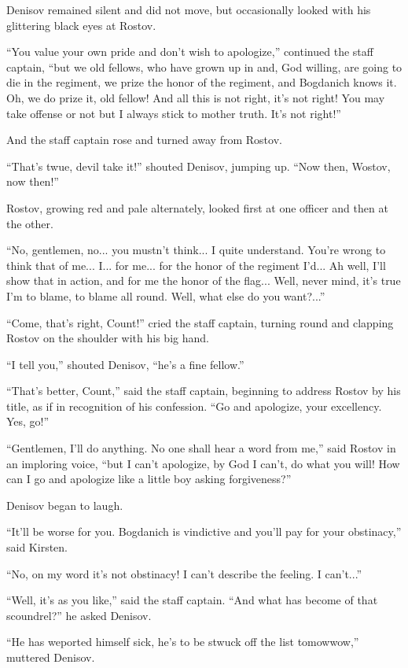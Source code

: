 Denisov remained silent and did not move, but occasionally looked
with his glittering black eyes at Rostov.

``You value your own pride and don't wish to apologize,''
continued the staff captain, ``but we old fellows, who have grown
up in and, God willing, are going to die in the regiment, we
prize the honor of the regiment, and Bogdanich knows it. Oh, we
do prize it, old fellow! And all this is not right, it's not
right! You may take offense or not but I always stick to mother
truth. It's not right!''

And the staff captain rose and turned away from Rostov.

``That's twue, devil take it!'' shouted Denisov, jumping
up. ``Now then, Wostov, now then!''

Rostov, growing red and pale alternately, looked first at one
officer and then at the other.

``No, gentlemen, no... you mustn't think... I quite
understand. You're wrong to think that of me... I... for
me... for the honor of the regiment I'd... Ah well, I'll show
that in action, and for me the honor of the flag... Well, never
mind, it's true I'm to blame, to blame all round. Well, what else
do you want?...''

``Come, that's right, Count!'' cried the staff captain, turning
round and clapping Rostov on the shoulder with his big hand.

``I tell you,'' shouted Denisov, ``he's a fine fellow.''

``That's better, Count,'' said the staff captain, beginning to
address Rostov by his title, as if in recognition of his
confession. ``Go and apologize, your excellency. Yes, go!''

``Gentlemen, I'll do anything. No one shall hear a word from
me,'' said Rostov in an imploring voice, ``but I can't apologize,
by God I can't, do what you will! How can I go and apologize like
a little boy asking forgiveness?''

Denisov began to laugh.

``It'll be worse for you. Bogdanich is vindictive and you'll pay
for your obstinacy,'' said Kirsten.

``No, on my word it's not obstinacy! I can't describe the
feeling. I can't...''

``Well, it's as you like,'' said the staff captain. ``And what
has become of that scoundrel?'' he asked Denisov.

``He has weported himself sick, he's to be stwuck off the list
tomowwow,'' muttered Denisov.

